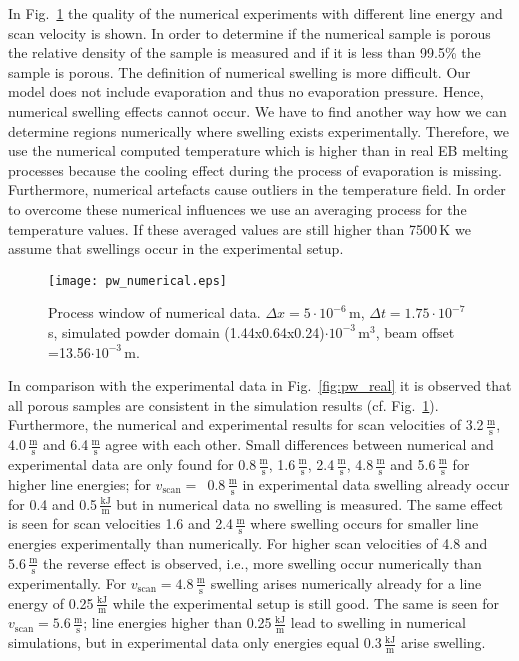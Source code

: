In Fig.~\ref{fig:pw_num} the quality of the numerical experiments with different line energy and scan velocity is shown. 
In order to determine if the numerical sample is porous the relative density of the sample is measured and if it is less than 99.5\% the 
sample is porous. The definition of numerical swelling is more difficult. Our model does not include evaporation and thus no evaporation pressure. 
Hence, numerical swelling effects cannot occur. We have to find another way how we can determine regions numerically where swelling exists experimentally. 
Therefore, we use the numerical computed temperature which is higher than in real EB melting processes because the cooling effect during the process of evaporation is missing.  
Furthermore, numerical artefacts cause outliers in the temperature field. 
In order to overcome these numerical influences we use an averaging process for the temperature values. If these averaged values are still higher than 7500\,K 
we assume that swellings occur in the experimental setup.

\begin{figure}[htpb!]
\centering
 \texttt{[image: pw\_numerical.eps]}
\caption{Process window of numerical data. $\Delta x=5\cdot10^{-6}$\,m, $\Delta t = 1.75\cdot10^{-7}$\,s, simulated powder domain (1.44x0.64x0.24)$\cdot10^{-3}\,\text{m}^{3}$, beam offset =13.56$\cdot10^{-3}$\,m.}
\label{fig:pw_num}
\end{figure}
In comparison with the experimental data in Fig.~\ref{fig:pw_real} it is observed that all porous samples 
are consistent in the simulation results (cf. Fig.~\ref{fig:pw_num}). Furthermore, the numerical and experimental results for scan velocities 
of 3.2\,$\frac{\text{m}}{\text{s}}$, 4.0\,$\frac{\text{m}}{\text{s}}$ and 6.4\,$\frac{\text{m}}{\text{s}}$ agree with each other.
Small differences between numerical and experimental data are only found for 0.8\,$\frac{\text{m}}{\text{s}}$, 1.6\,$\frac{\text{m}}{\text{s}}$, 2.4\,$\frac{\text{m}}{\text{s}}$, 
4.8\,$\frac{\text{m}}{\text{s}}$ and 5.6\,$\frac{\text{m}}{\text{s}}$ for higher line energies; for $v_{\text{scan}}=$~0.8\,$\frac{\text{m}}{\text{s}}$ in experimental data swelling
already occur for 0.4 and 0.5\,$\frac{\text{kJ}}{\text{m}}$ but in numerical data no swelling is measured. The same effect is seen for scan velocities 1.6 and 2.4\,$\frac{\text{m}}{\text{s}}$ 
where swelling occurs for smaller line energies experimentally than numerically. For higher scan velocities of 4.8 and 5.6\,$\frac{\text{m}}{\text{s}}$ 
the reverse effect is observed, i.e., more swelling occur numerically than experimentally. For $v_{\text{scan}}=4.8\,\frac{\text{m}}{\text{s}}$ swelling arises numerically already for a line 
energy of 0.25\,$\frac{\text{kJ}}{\text{m}}$ while the experimental setup is still good. The same is seen for $v_{\text{scan}}=5.6\,\frac{\text{m}}{\text{s}}$; line energies higher than
0.25\,$\frac{\text{kJ}}{\text{m}}$ lead to swelling in numerical simulations, but in experimental data only energies equal 0.3\,$\frac{\text{kJ}}{\text{m}}$ arise swelling. 

